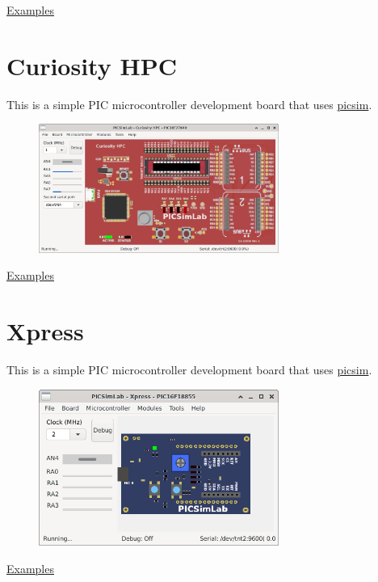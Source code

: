 \href{https://lcgamboa.github.io/picsimlab_examples/examples/examples_index_exp.html\#board_Curiosity}{Examples}

\section{Curiosity HPC}

This is a simple PIC microcontroller development board that uses \href{https://github.com/lcgamboa/picsim}{picsim}.

\begin{figure}[H]
\center
\includegraphics[width=0.7\textwidth]{img/Curiosity_HPC.png} 
\end{figure} 

\href{https://lcgamboa.github.io/picsimlab_examples/examples/examples_index_exp.html\#board_Curiosity}{Examples}

\section{Xpress}

This is a simple PIC microcontroller development board that uses \href{https://github.com/lcgamboa/picsim}{picsim}.

\begin{figure}[H]
\center
\includegraphics[width=0.7\textwidth]{img/Xpress.png} 
\end{figure} 

\href{https://lcgamboa.github.io/picsimlab_examples/examples/examples_index_exp.html\#board_Xpress}{Examples}


